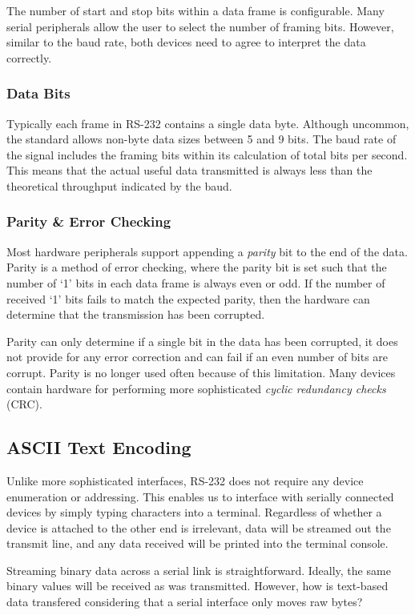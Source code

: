 \documentclass[11pt,fleqn]{book} %
\begin{document}
The number of start and stop bits within a data frame is configurable. Many serial peripherals allow the user to select the number of framing bits. However, similar to the baud rate, both devices need to agree to interpret the data correctly. 
 

\subsubsection{Data Bits} 
Typically each frame in RS-232 contains a single data byte. Although uncommon, the standard allows non-byte data sizes between 5 and 9 bits. The baud rate of the signal includes the framing bits within its calculation of total bits per second. This means that the actual useful data transmitted is always less than the theoretical throughput indicated by the baud. 

\subsubsection{Parity \& Error Checking}
Most hardware peripherals support appending a \textit{parity} bit to the end of the data. Parity is a method of error checking, where the parity bit is set such that the number of `1' bits in each data frame is always even or odd. If the number of received `1' bits fails to match the expected parity, then the hardware can determine that the transmission has been corrupted. 

Parity can only determine if a single bit in the data has been corrupted, it does not provide for any error correction and can fail if an even number of bits are corrupt. Parity is no longer used often because of this limitation. Many devices contain hardware for performing more sophisticated \textit{cyclic redundancy checks} (CRC).  


\subsection{ASCII Text Encoding}

Unlike more sophisticated interfaces, RS-232 does not require any device enumeration or addressing. This enables us to interface with serially connected devices by simply typing characters into a terminal. Regardless of whether a device is attached to the other end is irrelevant, data will be streamed out the transmit line, and any data received will be printed into the terminal console.  

Streaming binary data across a serial link is straightforward. Ideally, the same binary values will be received as was transmitted. However, how is text-based data transfered considering that a serial interface only moves raw bytes? 
\end{document}
